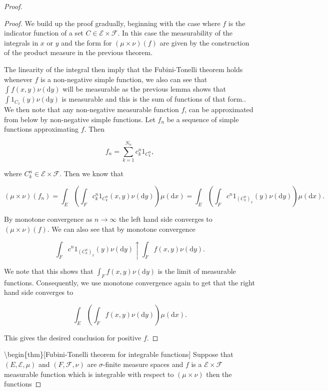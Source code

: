 \documentclass[
]{book}
\theoremstyle{definition}
\theoremstyle{definition}
\theoremstyle{definition}
\theoremstyle{definition}
\theoremstyle{remark}
\begin{document}
\begin{proof}
\begin{proof}
We build up the proof gradually, beginning with the case where \(f\) is the indicator function of a set \(C \in \mathcal{E} \times \mathcal{F}\). In this case the measurability of the integrals in \(x\) or \(y\) and the form for \((\mu \times \nu)(f)\) are given by the construction of the product measure in the previous theorem.

The linearity of the integral then imply that the Fubini-Tonelli theorem holds whenever \(f\) is a non-negative simple function, we also can see that \(\int f(x,y) \nu(\mathrm{d}y)\) will be measurable as the previous lemma shows that \(\int 1_{C_x}(y) \nu(\mathrm{d}y)\) is measurable and this is the sum of functions of that form.. We then note that any non-negative measurable function \(f\), can be approximated from below by non-negative simple functions. Let \(f_n\) be a sequence of simple functions approximating \(f\). Then

\[ f_n = \sum_{k=1}^{N_n} c^n_k 1_{C^n_k}, \]

where \(C^n_k \in \mathcal{E} \times \mathcal{F}\). Then we know that

\[ (\mu \times \nu)(f_n) = \int_E \left( \int_F c^n_k 1_{C^n_k}(x,y) \nu(\mathrm{d}y) \right) \mu(\mathrm{d}x) = \int_E \left( \int_F c^n 1_{(C^n_k)_x}(y) \nu(\mathrm{d}y) \right)\mu(\mathrm{d}x). \]

By monotone convergence as \(n \rightarrow \infty\) the left hand side converges to \((\mu \times \nu)(f)\). We can also see that by monotone convergence

\[ \int_F c^n 1_{(C^n_k)_x}(y) \nu(\mathrm{d}y) \uparrow \int_F f(x,y) \nu(\mathrm{d}y). \]

We note that this shows that \(\int_F f(x,y) \nu(\mathrm{d}y)\) is the limit of measurable functions. Consequently, we use monotone convergence again to get that the right hand side converges to

\[ \int_E \left( \int_F f(x,y) \nu(\mathrm{d}y) \right) \mu(\mathrm{d}x). \]

This gives the desired conclusion for positive \(f\).
\end{proof}

\textbackslash begin\{thm\}{[}Fubini-Tonelli theorem for integrable functions{]}
Suppose that \((E, \mathcal{E}, \mu)\) and \((F, \mathcal{F}, \nu)\) are \(\sigma\)-finite measure spaces and \(f\) is a \(\mathcal{E} \times \mathcal{F}\) measurable function which is integrable with respect to \((\mu \times \nu)\) then the functions


\end{proof}
\end{document}

